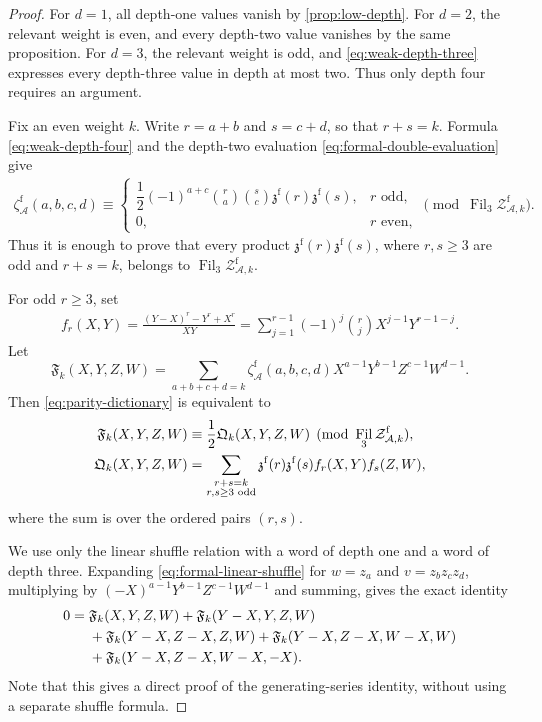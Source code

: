 \documentclass[12pt]{amsart}
\numberwithin{equation}{section}
\theoremstyle{plain}
\DeclareMathOperator{\Fil}{Fil}
\newcommand{\ZAfw}[1]{{\mathcal Z_{\mathcal A,#1}^{\mathrm f}}}
\newcommand{\zaf}[1]{\zeta_{\mathcal A}^{\mathrm f}(#1)}
\newcommand{\zzf}[1]{\mathfrak z^{\mathrm f}(#1)}
\begin{document}
\begin{proof}
For $d=1$, all depth-one values vanish by \cref{prop:low-depth}. For
$d=2$, the relevant weight is even, and every depth-two value vanishes by
the same proposition. For $d=3$, the relevant weight is odd, and
\eqref{eq:weak-depth-three} expresses every depth-three value in depth at
most two. Thus only depth four requires an argument.

Fix an even weight $k$. Write $r=a+b$ and $s=c+d$, so that $r+s=k$.
Formula
\eqref{eq:weak-depth-four} and the depth-two evaluation
\eqref{eq:formal-double-evaluation} give
\begin{align}\label{eq:parity-dictionary}
 \zaf{a,b,c,d}\equiv
 \begin{cases}
  \dfrac12(-1)^{a+c}\binom{r}{a}\binom{s}{c}\zzf r\zzf s,
       &r\text{ odd},\\[3pt]
  0,&r\text{ even},
 \end{cases}
 \pmod{\Fil_3\ZAfw{k}}.
\end{align}
Thus it is enough to prove that every product $\zzf r\zzf s$, where
$r,s\geq3$ are odd and $r+s=k$, belongs to $\Fil_3\ZAfw{k}$.

For odd $r\geq3$, set
\begin{align}\label{eq:odd-f-polynomial}
 f_r(X,Y)=\frac{(Y-X)^r-Y^r+X^r}{XY}
 =\sum_{j=1}^{r-1}(-1)^j\binom rj X^{j-1}Y^{r-1-j}.
\end{align}
Let
\[
 \mathfrak F_k(X,Y,Z,W)=
 \sum_{a+b+c+d=k}\zaf{a,b,c,d}
 X^{a-1}Y^{b-1}Z^{c-1}W^{d-1}.
\]
Then \eqref{eq:parity-dictionary} is equivalent to
\begin{align}\label{eq:F-Q-congruence}
 \mathfrak F_k(X,Y,Z,W)&\equiv\frac12\mathfrak Q_k(X,Y,Z,W)
       \pmod{\Fil_3\ZAfw{k}},\\
 \mathfrak Q_k(X,Y,Z,W)&=
 \sum_{\substack{r+s=k\\r,s\geq3\text{ odd}}}
 \zzf r\zzf s f_r(X,Y)f_s(Z,W),\notag
\end{align}
where the sum is over the ordered pairs $(r,s)$.

We use only the linear shuffle relation with a word of depth one and a
word of depth three. Expanding
\eqref{eq:formal-linear-shuffle} for
$w=z_a$ and $v=z_bz_cz_d$, multiplying by
$(-X)^{a-1}Y^{b-1}Z^{c-1}W^{d-1}$ and summing, gives the exact identity
\begin{align}
0={}&\mathfrak F_k(X,Y,Z,W)+\mathfrak F_k(Y-X,Y,Z,W)\notag\\
 &+\mathfrak F_k(Y-X,Z-X,Z,W)
 +\mathfrak F_k(Y-X,Z-X,W-X,W)\notag\\
 &+\mathfrak F_k(Y-X,Z-X,W-X,-X).
\label{eq:five-term-linear-shuffle}
\end{align}
Note that this gives a direct proof of the generating-series identity,
without using a separate shuffle formula.


\end{proof}
\end{document}
